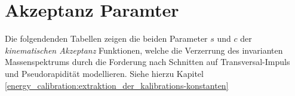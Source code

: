 


\chapter{Akzeptanz Paramter}
Die folgendenden Tabellen zeigen die beiden Parameter $s$ und $c$ der
\textit{kinematischen Akzeptanz} Funktionen, welche die Verzerrung des
invarianten Massenspektrums durch die Forderung nach Schnitten auf
Transversal-Impuls und Pseudorapidität modellieren. Siehe hierzu Kapitel
\ref{energy_calibration:extraktion_der_kalibrations-konstanten}
